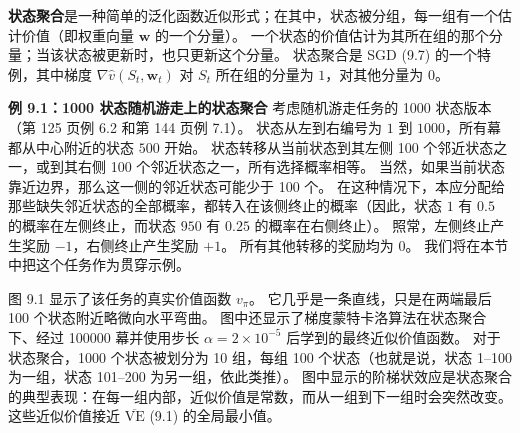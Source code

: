 \documentclass[UTF8, 12pt, fontset=fandol, oneside]{ctexart}
\begin{document}
\begin{center}
\end{center}

\textbf{状态聚合}是一种简单的泛化函数近似形式；在其中，状态被分组，每一组有一个估计价值（即权重向量 $\mathbf{w}$ 的一个分量）。
一个状态的价值估计为其所在组的那个分量；当该状态被更新时，也只更新这个分量。
状态聚合是 SGD (9.7) 的一个特例，其中梯度 $\nabla\hat{v}(S_t,\mathbf{w}_t)$ 对 $S_t$ 所在组的分量为 $1$，对其他分量为 $0$。

\noindent\textbf{例 9.1：1000 状态随机游走上的状态聚合}
考虑随机游走任务的 1000 状态版本（第 125 页例 6.2 和第 144 页例 7.1）。
状态从左到右编号为 $1$ 到 $1000$，所有幕都从中心附近的状态 $500$ 开始。
状态转移从当前状态到其左侧 100 个邻近状态之一，或到其右侧 100 个邻近状态之一，所有选择概率相等。
当然，如果当前状态靠近边界，那么这一侧的邻近状态可能少于 100 个。
在这种情况下，本应分配给那些缺失邻近状态的全部概率，都转入在该侧终止的概率（因此，状态 $1$ 有 $0.5$ 的概率在左侧终止，而状态 $950$ 有 $0.25$ 的概率在右侧终止）。
照常，左侧终止产生奖励 $-1$，右侧终止产生奖励 $+1$。
所有其他转移的奖励均为 $0$。
我们将在本节中把这个任务作为贯穿示例。

图 9.1 显示了该任务的真实价值函数 $v_\pi$。
它几乎是一条直线，只是在两端最后 100 个状态附近略微向水平弯曲。
图中还显示了梯度蒙特卡洛算法在状态聚合下、经过 100000 幕并使用步长 $\alpha=2\times10^{-5}$ 后学到的最终近似价值函数。
对于状态聚合，1000 个状态被划分为 10 组，每组 100 个状态（也就是说，状态 1--100 为一组，状态 101--200 为另一组，依此类推）。
图中显示的阶梯状效应是状态聚合的典型表现：在每一组内部，近似价值是常数，而从一组到下一组时会突然改变。
这些近似价值接近 $\overline{\mathrm{VE}}$ (9.1) 的全局最小值。
\end{document}
